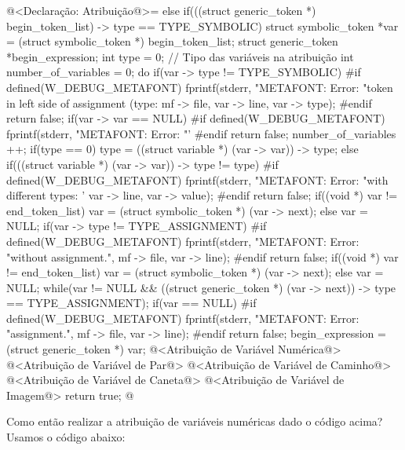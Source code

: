 \iniciocodigo
@<Declaração: Atribuição@>=
else if(((struct generic_token *) begin_token_list) -> type ==
        TYPE_SYMBOLIC){
  struct symbolic_token *var = (struct symbolic_token *) begin_token_list;
  struct generic_token *begin_expression;
  int type = 0; // Tipo das variáveis na atribuição
  int number_of_variables = 0;
  do{
    if(var -> type != TYPE_SYMBOLIC){
#if defined(W_DEBUG_METAFONT)
      fprintf(stderr, "METAFONT: Error: %
              "token in left side of assignment (type: %
              mf -> file,
              var -> line, var -> type);
#endif
      return false;
    }
    if(var -> var == NULL){
#if defined(W_DEBUG_METAFONT)
      fprintf(stderr, "METAFONT: Error: %
              "'%
#endif
      return false;
    }
    number_of_variables ++;
    if(type == 0)
      type = ((struct variable *) (var -> var)) -> type;
    else if(((struct variable *) (var -> var)) -> type != type){
#if defined(W_DEBUG_METAFONT)
      fprintf(stderr, "METAFONT: Error: %
              "with different types: '%
              var -> line, var -> value);
#endif
      return false;
    }
    if((void *) var != end_token_list)
      var = (struct symbolic_token *) (var -> next);
    else
      var = NULL;
    if(var -> type != TYPE_ASSIGNMENT){
#if defined(W_DEBUG_METAFONT)
      fprintf(stderr, "METAFONT: Error: %
              "without assignment.\n", mf -> file, var -> line);
#endif
      return false;
    }
    if((void *) var != end_token_list)
      var = (struct symbolic_token *) (var -> next);
    else
      var = NULL;
  } while(var != NULL &&
          ((struct generic_token *) (var -> next)) -> type ==
          TYPE_ASSIGNMENT);
  if(var == NULL){
#if defined(W_DEBUG_METAFONT)
      fprintf(stderr, "METAFONT: Error: %
              "assignment.\n", mf -> file, var -> line);
#endif
      return false;
  }
  begin_expression = (struct generic_token *) var;
  @<Atribuição de Variável Numérica@>
  @<Atribuição de Variável de Par@>
  @<Atribuição de Variável de Caminho@>
  @<Atribuição de Variável de Caneta@>
  @<Atribuição de Variável de Imagem@>
  return true;
}
@
\fimcodigo


Como então realizar a atribuição de variáveis numéricas dado o código
acima? Usamos o código abaixo:

